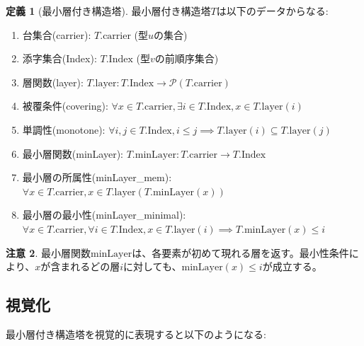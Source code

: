 \documentclass[a4paper,12pt]{article}
\theoremstyle{definition}
\newtheorem{definition}{定義}[section]
\newtheorem{remark}[definition]{注意}
\begin{document}
\begin{definition}[最小層付き構造塔]\label{def:tower_with_min}
最小層付き構造塔$T$は以下のデータからなる:
\begin{enumerate}
\item 台集合(carrier): $T.\text{carrier}$ (型$u$の集合)
\item 添字集合(Index): $T.\text{Index}$ (型$v$の前順序集合)
\item 層関数(layer): $T.\text{layer} : T.\text{Index} \to \mathcal{P}(T.\text{carrier})$
\item 被覆条件(covering): $\forall x \in T.\text{carrier}, \exists i \in T.\text{Index}, x \in T.\text{layer}(i)$
\item 単調性(monotone): $\forall i, j \in T.\text{Index}, i \leq j \implies T.\text{layer}(i) \subseteq T.\text{layer}(j)$
\item 最小層関数(minLayer): $T.\text{minLayer} : T.\text{carrier} \to T.\text{Index}$
\item 最小層の所属性(minLayer\_mem): $\forall x \in T.\text{carrier}, x \in T.\text{layer}(T.\text{minLayer}(x))$
\item 最小層の最小性(minLayer\_minimal): $\forall x \in T.\text{carrier}, \forall i \in T.\text{Index}, x \in T.\text{layer}(i) \implies T.\text{minLayer}(x) \leq i$
\end{enumerate}
\end{definition}

\begin{remark}
最小層関数$\text{minLayer}$は、各要素が初めて現れる層を返す。最小性条件により、$x$が含まれるどの層$i$に対しても、$\text{minLayer}(x) \leq i$が成立する。
\end{remark}

\subsection{視覚化}

最小層付き構造塔を視覚的に表現すると以下のようになる:
\end{document}
